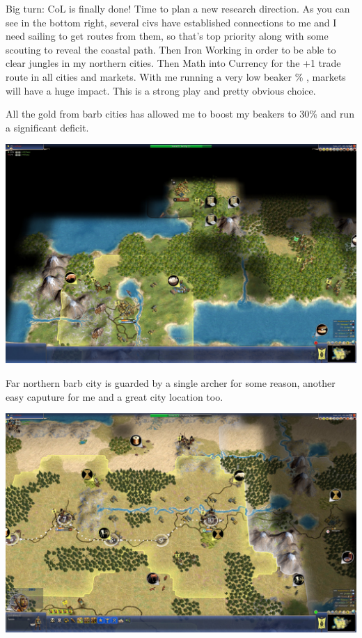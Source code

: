 \documentclass[10pt]{article}
\begin{document}
Big turn: CoL is finally done! Time to plan a new research
direction. As you can see in the bottom right, several civs have
established connections to me and I need sailing to get routes from
them, so that's top priority along with some scouting to reveal the
coastal path. Then Iron Working in order to be able to clear jungles
in my northern cities. Then Math into Currency for the +1 trade route
in all cities and markets. With me running a very low beaker \% ,
markets will have a huge impact. This is a strong play and pretty
obvious choice.

All the gold from barb cities has allowed me to boost my beakers to
30\% and run a significant deficit.

\includegraphics[width=1.0\textwidth]{102}

Far northern barb city is guarded by a single archer for some reason, another easy caputure
for me and a great city location too.

\includegraphics[width=1.0\textwidth]{103}
\end{document}
